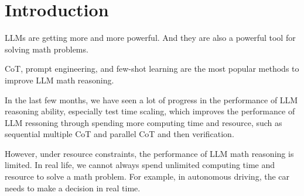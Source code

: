 \section{Introduction}
LLMs are getting more and more powerful. And they are also a powerful tool for solving math problems.

CoT, prompt engineering, and few-shot learning are the most popular methods to improve LLM math reasoning. 

In the last few months, we have seen a lot of progress in the performance of LLM reasoning ability, especially test time scaling, which improves the performance of LLM ressoning through spending more computing time and resource, such as sequential multiple CoT and parallel CoT and then verification.

However, under resource constraints, the performance of LLM math reasoning is limited. In real life, we cannot always spend unlimited computing time and resource to solve a math problem. For example, in autonomous driving, the car needs to make a decision in real time.